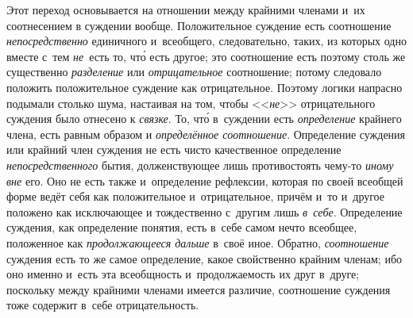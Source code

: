 Этот переход основывается на отношении между крайними членами и~их соотнесением
в суждении вообще. Положительное суждение есть соотношение
{\em непосредственно} единичного и~всеобщего, следовательно, таких, из которых
одно вместе с~тем {\em не}~есть то, чт\'{о} есть другое; это соотношение есть
поэтому столь же существенно {\em разделение} или {\em отрицательное}
соотношение; потому следовало положить положительное суждение как отрицательное.
Поэтому логики напрасно подымали столько шума, настаивая на том, чтобы
<<{\em не}>> отрицательного суждения было отнесено к {\em связке}. То, чт\'{о}
в~суждении есть {\em определение} крайнего члена, есть равным образом
и {\em определённое соотношение}. Определение суждения или крайний член
суждения не есть чисто качественное определение {\em непосредственного} бытия,
долженствующее лишь противостоять чему-то {\em иному вне} его. Оно не есть
также и~определение рефлексии, которая по своей всеобщей форме ведёт себя как
положительное и~отрицательное, причём и~то и~другое положено как исключающее и
тождественно с~другим лишь {\em в~себе}. Определение суждения, как определение
понятия, есть в~себе самом нечто всеобщее, положенное как {\em продолжающееся
дальше} в~своё иное. Обратно, {\em соотношение} суждения есть то же самое
определение, какое свойственно крайним членам; ибо оно именно и~есть эта
всеобщность и~продолжаемость их друг в~друге; поскольку между крайними членами
имеется различие, соотношение суждения тоже содержит в~себе отрицательность.

